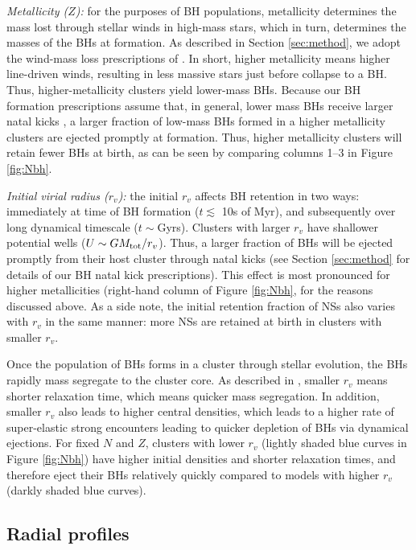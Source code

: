 \documentclass[twocolumn,tighten]{aastex63}
\begin{document}
\textit{Metallicity ($Z$):} for the purposes of BH populations, metallicity determines the mass lost through stellar winds in high-mass stars, which in turn, determines the masses of the BHs at formation. As described in Section \ref{sec:method}, we adopt the wind-mass loss prescriptions of \citet{Vink2001}. In short, higher metallicity means higher line-driven winds, resulting in less massive stars just before collapse to a BH. Thus, higher-metallicity clusters yield lower-mass BHs. Because our BH formation prescriptions assume that, in general, lower mass BHs receive larger natal kicks \citep[because lower mass BHs form with less fallback; see Section \ref{sec:summary} and][]{Morscher2015}, a larger fraction of low-mass BHs formed in a higher metallicity clusters are ejected promptly at formation. Thus, higher metallicity clusters will retain fewer BHs at birth, as can be seen by comparing columns 1--3 in Figure \ref{fig:Nbh}.

\textit{Initial virial radius ($r_v$):} the initial $r_v$ affects BH retention in two ways: immediately at time of BH formation ($t \lesssim$ 10s of Myr), and subsequently over long dynamical timescale ($t\sim$Gyrs). Clusters with larger $r_v$ have shallower potential wells ($U \sim GM_{\rm{tot}}/r_v$). Thus, a larger fraction of BHs will be ejected promptly from their host cluster through natal kicks (see Section \ref{sec:method} for details of our BH natal kick prescriptions). This effect is most pronounced for higher metallicities (right-hand column of Figure \ref{fig:Nbh}, for the reasons discussed above. As a side note, the initial retention fraction of NSs also varies with $r_v$ in the same manner: more NSs are retained at birth in clusters with smaller $r_v$.

Once the population of BHs forms in a cluster through stellar evolution, the BHs rapidly mass segregate to the cluster core. As described in \citet{Kremer2019a}, smaller $r_v$ means shorter relaxation time, which means quicker mass segregation. In addition, smaller $r_v$ also leads to higher central densities, which leads to a higher rate of super-elastic strong encounters leading to quicker depletion of BHs via dynamical ejections. For fixed $N$ and $Z$, clusters with lower $r_v$ (lightly shaded blue curves in Figure \ref{fig:Nbh}) have higher initial densities and shorter relaxation times, and therefore eject their BHs relatively quickly compared to models with higher $r_v$ (darkly shaded blue curves).

\subsection{Radial profiles}
\end{document}
